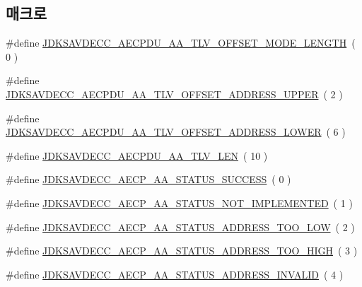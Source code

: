 \subsection*{매크로}
\begin{DoxyCompactItemize}
\item 
\#define \hyperlink{group___a_e_c_p___a_a__tlv_ga7670a633c9cea7112916b80201d0f531}{J\+D\+K\+S\+A\+V\+D\+E\+C\+C\+\_\+\+A\+E\+C\+P\+D\+U\+\_\+\+A\+A\+\_\+\+T\+L\+V\+\_\+\+O\+F\+F\+S\+E\+T\+\_\+\+M\+O\+D\+E\+\_\+\+L\+E\+N\+G\+TH}~( 0 )
\item 
\#define \hyperlink{group___a_e_c_p___a_a__tlv_gad36c7a1e16934d23f2e6c3b4599b56a9}{J\+D\+K\+S\+A\+V\+D\+E\+C\+C\+\_\+\+A\+E\+C\+P\+D\+U\+\_\+\+A\+A\+\_\+\+T\+L\+V\+\_\+\+O\+F\+F\+S\+E\+T\+\_\+\+A\+D\+D\+R\+E\+S\+S\+\_\+\+U\+P\+P\+ER}~( 2 )
\item 
\#define \hyperlink{group___a_e_c_p___a_a__tlv_ga434b44cc7306a8c79c916c5fa226e951}{J\+D\+K\+S\+A\+V\+D\+E\+C\+C\+\_\+\+A\+E\+C\+P\+D\+U\+\_\+\+A\+A\+\_\+\+T\+L\+V\+\_\+\+O\+F\+F\+S\+E\+T\+\_\+\+A\+D\+D\+R\+E\+S\+S\+\_\+\+L\+O\+W\+ER}~( 6 )
\item 
\#define \hyperlink{group___a_e_c_p___a_a__tlv_ga8c9adb511e50d7ed81e30527a0f86d5b}{J\+D\+K\+S\+A\+V\+D\+E\+C\+C\+\_\+\+A\+E\+C\+P\+D\+U\+\_\+\+A\+A\+\_\+\+T\+L\+V\+\_\+\+L\+EN}~( 10 )
\item 
\#define \hyperlink{group___a_e_c_p___a_a__tlv_gabfb6fac939b72673f5fd0c09bafe27b5}{J\+D\+K\+S\+A\+V\+D\+E\+C\+C\+\_\+\+A\+E\+C\+P\+\_\+\+A\+A\+\_\+\+S\+T\+A\+T\+U\+S\+\_\+\+S\+U\+C\+C\+E\+SS}~( 0 )
\item 
\#define \hyperlink{group___a_e_c_p___a_a__tlv_ga9560028a5033ecc9940cc22de0c2838f}{J\+D\+K\+S\+A\+V\+D\+E\+C\+C\+\_\+\+A\+E\+C\+P\+\_\+\+A\+A\+\_\+\+S\+T\+A\+T\+U\+S\+\_\+\+N\+O\+T\+\_\+\+I\+M\+P\+L\+E\+M\+E\+N\+T\+ED}~( 1 )
\item 
\#define \hyperlink{group___a_e_c_p___a_a__tlv_gaadabf636d68e5add7c32ce1291a8bdeb}{J\+D\+K\+S\+A\+V\+D\+E\+C\+C\+\_\+\+A\+E\+C\+P\+\_\+\+A\+A\+\_\+\+S\+T\+A\+T\+U\+S\+\_\+\+A\+D\+D\+R\+E\+S\+S\+\_\+\+T\+O\+O\+\_\+\+L\+OW}~( 2 )
\item 
\#define \hyperlink{group___a_e_c_p___a_a__tlv_ga44ca9322769ffc8db82a349f0a828541}{J\+D\+K\+S\+A\+V\+D\+E\+C\+C\+\_\+\+A\+E\+C\+P\+\_\+\+A\+A\+\_\+\+S\+T\+A\+T\+U\+S\+\_\+\+A\+D\+D\+R\+E\+S\+S\+\_\+\+T\+O\+O\+\_\+\+H\+I\+GH}~( 3 )
\item 
\#define \hyperlink{group___a_e_c_p___a_a__tlv_gad43b806356eee9b32ffee1dd7acd1cd6}{J\+D\+K\+S\+A\+V\+D\+E\+C\+C\+\_\+\+A\+E\+C\+P\+\_\+\+A\+A\+\_\+\+S\+T\+A\+T\+U\+S\+\_\+\+A\+D\+D\+R\+E\+S\+S\+\_\+\+I\+N\+V\+A\+L\+ID}~( 4 )

\end{DoxyCompactItemize}
